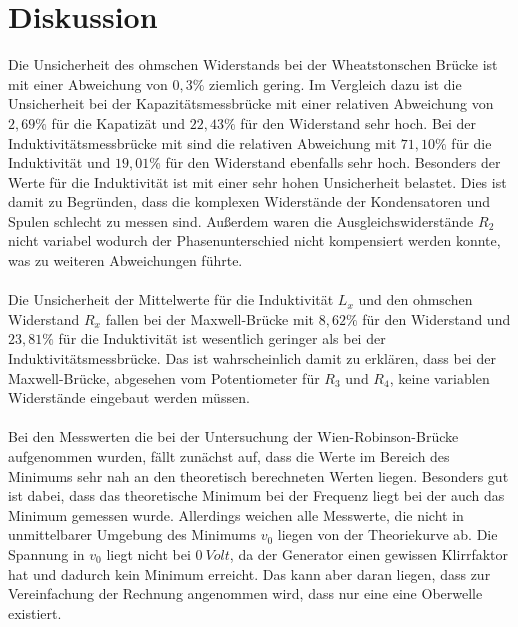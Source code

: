 \section{Diskussion}
\label{sec:Diskussion}
Die Unsicherheit des ohmschen Widerstands bei der Wheatstonschen Brücke ist mit einer Abweichung von $0,3\%$ ziemlich gering.
Im Vergleich dazu ist die Unsicherheit bei der Kapazitätsmessbrücke mit einer relativen Abweichung von $2,69\%$ für die Kapatizät und $22,43\%$ für den Widerstand sehr hoch.
Bei der Induktivitätsmessbrücke mit sind die relativen Abweichung mit $71,10\%$ für die Induktivität und $19,01\%$ für den Widerstand ebenfalls sehr hoch.
Besonders der Werte für die Induktivität ist mit einer sehr hohen Unsicherheit belastet.
Dies ist damit zu Begründen, dass die komplexen Widerstände der Kondensatoren und Spulen schlecht zu messen sind.
Außerdem waren die Ausgleichswiderstände $R_2$ nicht variabel wodurch der Phasenunterschied nicht kompensiert werden konnte, was zu weiteren Abweichungen führte.
\\\\
Die Unsicherheit der Mittelwerte für die Induktivität $L_x$ und den ohmschen Widerstand $R_x$ fallen bei der Maxwell-Brücke mit $8,62\%$ für den Widerstand und $23,81\%$ für die Induktivität ist wesentlich geringer als bei der Induktivitätsmessbrücke.
Das ist wahrscheinlich damit zu erklären, dass bei der Maxwell-Brücke, abgesehen vom Potentiometer für $R_3$ und $R_4$, keine variablen Widerstände eingebaut werden müssen.
\\\\
Bei den Messwerten die bei der Untersuchung der Wien-Robinson-Brücke aufgenommen wurden, fällt zunächst auf, dass die Werte im Bereich des Minimums sehr nah an den theoretisch berechneten Werten liegen.
Besonders gut ist dabei, dass das theoretische Minimum bei der Frequenz liegt bei der auch das Minimum gemessen wurde.
Allerdings weichen alle Messwerte, die nicht in unmittelbarer Umgebung des Minimums $v_0$ liegen von der Theoriekurve ab.
Die Spannung in $v_0$ liegt nicht bei $\SI{0}{Volt}$, da der Generator einen gewissen Klirrfaktor hat und dadurch kein Minimum erreicht.
Das kann aber daran liegen, dass zur Vereinfachung der Rechnung angenommen wird, dass nur eine eine Oberwelle existiert.